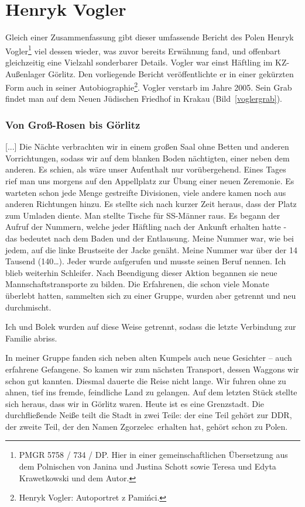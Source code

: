 \section*{Henryk Vogler}\label{vogler}
Gleich einer Zusammenfassung gibt dieser umfassende Bericht des Polen Henryk Vogler\footnote{PMGR 5758 / 734 / DP. Hier in einer gemeinschaftlichen Übersetzung aus dem Polnischen von Janina und Justina Schott sowie Teresa und Edyta Krawetkowski und dem Autor.} viel dessen wieder, was zuvor bereits Erwähnung fand, und offenbart gleichzeitig eine Vielzahl sonderbarer Details. Vogler war einst Häftling im KZ-Außenlager Görlitz. Den vorliegende Bericht veröffentlichte er in einer gekürzten Form auch in seiner Autobiographie\footnote{Henryk Vogler: Autoportret z Pamińci.}. Vogler verstarb im Jahre 2005. Sein Grab findet man auf dem Neuen Jüdischen Friedhof in Krakau (Bild~\ref{voglergrab}).  




\subsubsection*{Von Groß-Rosen bis Görlitz}
[...]
Die Nächte verbrachten wir in einem großen Saal ohne Betten und anderen Vorrichtungen, sodass wir auf dem blanken Boden nächtigten, einer neben dem anderen. Es schien, als wäre unser Aufenthalt nur vorübergehend. Eines Tages rief man uns morgens auf den Appellplatz zur Übung einer neuen Zeremonie. Es warteten schon jede Menge gestreifte Divisionen, viele andere kamen noch aus anderen Richtungen hinzu. Es stellte sich nach kurzer Zeit heraus, dass der Platz zum Umladen diente. Man stellte Tische für SS-Männer raus. Es begann der Aufruf der Nummern, welche jeder Häftling nach der Ankunft erhalten hatte - das bedeutet nach dem Baden und der Entlausung. Meine Nummer war, wie bei jedem, auf die linke Brustseite der Jacke  genäht. Meine Nummer war über der 14 Tausend (140\dots). Jeder wurde aufgerufen und musste seinen Beruf nennen. Ich blieb weiterhin Schleifer. Nach Beendigung dieser Aktion begannen sie neue Mannschaftstransporte zu bilden. Die Erfahrenen, die schon viele Monate überlebt hatten, sammelten sich zu einer Gruppe, wurden aber getrennt und neu durchmischt.

Ich und Bolek wurden auf diese Weise getrennt, sodass die letzte Verbindung zur Familie abriss.

In meiner Gruppe fanden sich neben alten Kumpels auch neue Gesichter -- auch erfahrene Gefangene. So kamen wir zum nächsten Transport, dessen Waggons wir schon gut kannten. Diesmal dauerte die Reise nicht lange. Wir fuhren ohne zu ahnen, tief ins fremde, feindliche Land zu gelangen. Auf dem letzten Stück stellte sich heraus, dass wir in Görlitz waren. Heute ist es eine Grenzstadt. Die durchfließende Neiße teilt die Stadt in zwei Teile: der eine Teil gehört zur DDR, der zweite Teil, der den Namen \glqq Zgorzelec\grqq~erhalten hat, gehört schon zu Polen.

